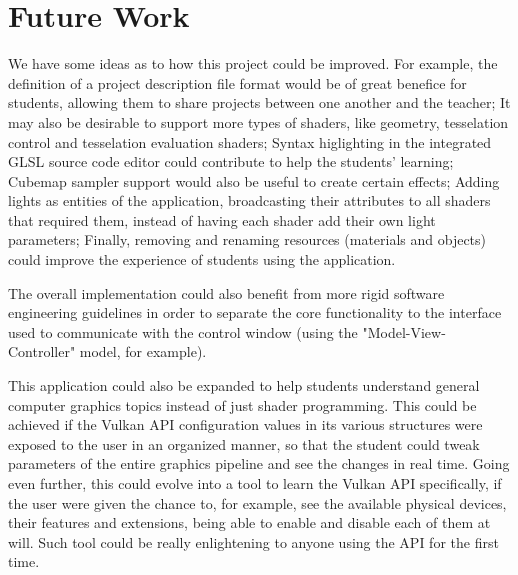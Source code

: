 \section{Future Work}
We have some ideas as to how this project could be improved. For example, the definition of a project description file format would be of great benefice for students, allowing them to share projects between one another and the teacher; It may also be desirable to support more types of shaders, like geometry, tesselation control and tesselation evaluation shaders; Syntax higlighting in the integrated GLSL source code editor could contribute to help the students' learning;  Cubemap sampler support would also be useful to create certain effects; Adding lights as entities of the application, broadcasting their attributes to all shaders that required them, instead of having each shader add their own light parameters; Finally, removing and renaming resources (materials and objects) could improve the experience of students using the application.

The overall implementation could also benefit from more rigid software engineering guidelines in order to separate the core functionality to the interface used to communicate with the control window (using the "Model-View-Controller" model, for example).

This application could also be expanded to help students understand general computer graphics topics instead of just shader programming. This could be achieved if the Vulkan API configuration values in its various structures were exposed to the user in an organized manner, so that the student could tweak parameters of the entire graphics pipeline and see the changes in real time. Going even further, this could evolve into a tool to learn the Vulkan API specifically, if the user were given the chance to, for example, see the available physical devices, their features and extensions, being able to enable and disable each of them at will. Such tool could be really enlightening to anyone using the API for the first time.
